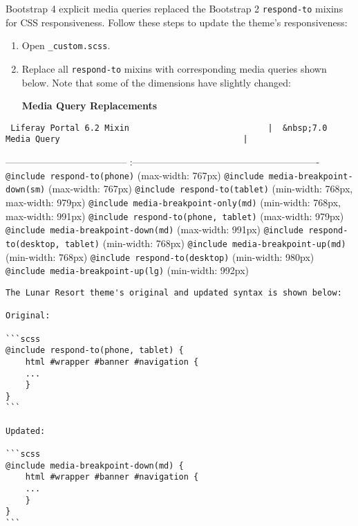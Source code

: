 Bootstrap 4 explicit media queries replaced the Bootstrap 2
\texttt{respond-to} mixins for CSS responsiveness. Follow these steps to
update the theme's responsiveness:

\begin{enumerate}
\def\labelenumi{\arabic{enumi}.}
\item
  Open \texttt{\_custom.scss}.
\item
  Replace all \texttt{respond-to} mixins with corresponding media
  queries shown below. Note that some of the dimensions have slightly
  changed:

  \textbf{Media Query Replacements}
\end{enumerate}

\noindent\hrulefill

\begin{verbatim}
 Liferay Portal 6.2 Mixin                            |  &nbsp;7.0 Media Query                                     |
\end{verbatim}

\noindent\hrulefill --------------------------------------
\textbar:----------------------------------------------------------
\textbar{} \texttt{@include\ respond-to(phone)} (max-width: 767px)
\textbar{} \texttt{@include\ media-breakpoint-down(sm)} (max-width:
767px) \textbar{} \texttt{@include\ respond-to(tablet)} (min-width:
768px, max-width: 979px) \textbar{}
\texttt{@include\ media-breakpoint-only(md)} (min-width: 768px,
max-width: 991px) \textbar{}
\texttt{@include\ respond-to(phone,\ tablet)} (max-width: 979px)
\textbar{} \texttt{@include\ media-breakpoint-down(md)} (max-width:
991px) \textbar{} \texttt{@include\ respond-to(desktop,\ tablet)}
(min-width: 768px) \textbar{} \texttt{@include\ media-breakpoint-up(md)}
(min-width: 768px) \textbar{} \texttt{@include\ respond-to(desktop)}
(min-width: 980px) \textbar{} \texttt{@include\ media-breakpoint-up(lg)}
(min-width: 992px) \textbar{}

\begin{verbatim}
The Lunar Resort theme's original and updated syntax is shown below:

Original:

```scss
@include respond-to(phone, tablet) {
    html #wrapper #banner #navigation {
    ...
    }
}
```

Updated:

```scss
@include media-breakpoint-down(md) {
    html #wrapper #banner #navigation {
    ...
    }
}
```
\end{verbatim}

